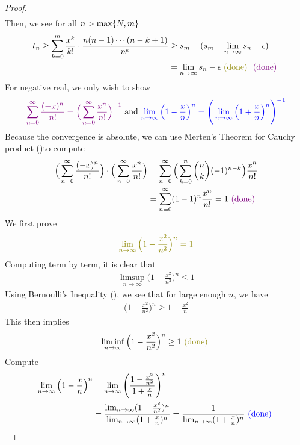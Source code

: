 \documentclass{report}
\begin{document}
\begin{proof}
\begin{align*}
\end{align*}
Then, we see for all $n>\max \{ N,m \}$
\begin{align*}
  t_n\geq \sum_{k=0}^m \frac{x^k}{k!}\cdot \frac{n(n-1)\cdots (n-k+1)}{n^k} &\geq s_m - (s_m-\lim_{n\to \infty}s_n -\epsilon )\\
  &=\lim_{n\to \infty}s_n -\epsilon \odone \vdone
\end{align*}
For negative real, we only wish to show 
\begin{align*}
\textcolor{violet}{\sum_{n=0}^\infty \frac{(-x)^n}{n!}=\Big(\sum_{n=0}^\infty \frac{x^n}{n!} \Big)^{-1}}\text{ and }\textcolor{blue}{\lim_{n\to \infty}\Big(1-\frac{x}{n} \Big)^{n}=\Bigg(\lim_{n\to\infty    }\Big(1+\frac{x}{n} \Big)^{n} \Bigg)^{-1}}
\end{align*}
Because the convergence is absolute, we can use Merten's Theorem for Cauchy product ()to compute 
\begin{align*}
\Big( \sum_{n=0}^{\infty} \frac{(-x)^n}{n!}\Big)\cdot \Big( \sum_{n=0}^\infty \frac{x^n}{n!} \Big)&= \sum_{n=0}^\infty \Big(\sum_{k=0}^n \binom{n}{k}(-1)^{n-k} \Big) \frac{x^n}{n!}\\
&=\sum_{n=0}^\infty (1-1)^{n} \frac{x^n}{n!}=1 \textcolor{violet}{\text{ (done) }}
\end{align*}
We first prove 
\begin{align*}
\olive{\lim_{n\to \infty}\Big(1-\frac{x^2}{n^2} \Big)^n=1}
\end{align*}
Computing term by term, it is clear that 
\begin{align*}
\limsup_{n\to\infty} \Big(1-\frac{x^2}{n^2} \Big)^n \leq 1
\end{align*}
Using Bernoulli's Inequality (), we see that for large enough $n$, we have 
\begin{align*}
  \Big(1-\frac{x^2}{n^2} \Big)^n\geq 1-\frac{x^2}{n} 
\end{align*}
This then implies 
\begin{align*}
\liminf_{n\to\infty} \Big(1-\frac{x^2}{n^2} \Big)^n \geq 1\odone
\end{align*}
Compute
\begin{align*}
\lim_{n\to \infty}\Big(1-\frac{x}{n} \Big)^{n} &= \lim_{n\to \infty}\Bigg(\frac{1-\frac{x^2}{n^2}}{1+\frac{x}{n}}\Bigg)^n \\
&=\frac{\lim_{n \to \infty} (1-\frac{x^2}{n^2})^n}{\lim_{n\to \infty}(1+\frac{x}{n})^n}=\frac{1}{\lim_{n\to \infty}(1+\frac{x}{n})^n}\textcolor{blue}{\text{ (done) }}
\end{align*}





\end{proof}
\end{document}
